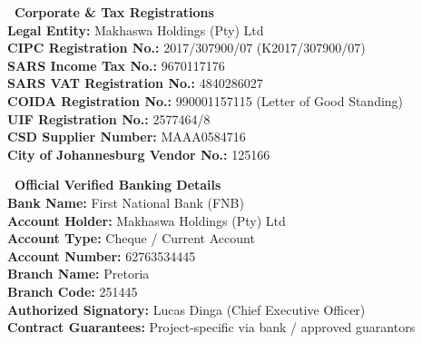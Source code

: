 \documentclass[a4paper,11pt]{article}
\begin{document}
\noindent
\begin{minipage}[t]{0.485\textwidth}
    \begin{tcolorbox}[enhanced, colback=white, colframe=mhlightgray, boxrule=0.8pt, arc=4pt, left=8pt, right=8pt, top=7pt, bottom=7pt, drop shadow=black!3]
        {\fontsize{8.5pt}{11pt}\selectfont\bfseries\color{mhnavy}\faFileContract\ Corporate \& Tax Registrations}\\[3pt]
        {\fontsize{7.8pt}{11.0pt}\selectfont\color{mhtext}
        \textbf{Legal Entity:} Makhaswa Holdings (Pty) Ltd\\
        \textbf{CIPC Registration No.:} 2017/307900/07 (K2017/307900/07)\\
        \textbf{SARS Income Tax No.:} 9670117176\\
        \textbf{SARS VAT Registration No.:} 4840286027\\
        \textbf{COIDA Registration No.:} 990001157115 (Letter of Good Standing)\\
        \textbf{UIF Registration No.:} 2577464/8\\
        \textbf{CSD Supplier Number:} MAAA0584716\\
        \textbf{City of Johannesburg Vendor No.:} 125166
        }
    \end{tcolorbox}
\end{minipage}
\hfill
\begin{minipage}[t]{0.485\textwidth}
    \begin{tcolorbox}[enhanced, colback=white, colframe=mhlightgray, boxrule=0.8pt, arc=4pt, left=8pt, right=8pt, top=7pt, bottom=7pt, drop shadow=black!3]
        {\fontsize{8.5pt}{11pt}\selectfont\bfseries\color{mhnavy}\faUniversity\ Official Verified Banking Details}\\[3pt]
        {\fontsize{7.8pt}{11.0pt}\selectfont\color{mhtext}
        \textbf{Bank Name:} First National Bank (FNB)\\
        \textbf{Account Holder:} Makhaswa Holdings (Pty) Ltd\\
        \textbf{Account Type:} Cheque / Current Account\\
        \textbf{Account Number:} 62763534445\\
        \textbf{Branch Name:} Pretoria\\
        \textbf{Branch Code:} 251445\\
        \textbf{Authorized Signatory:} Lucas Dinga (Chief Executive Officer)\\
        \textbf{Contract Guarantees:} Project-specific via bank / approved guarantors
        }
    \end{tcolorbox}
\end{minipage}
\end{document}
